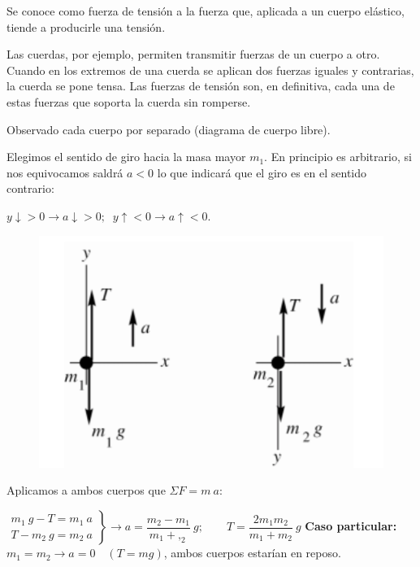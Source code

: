 \vspace{6mm} %
\small{\textsf{Se conoce como fuerza de tensión a la fuerza que, aplicada a un cuerpo elástico, tiende a producirle una tensión.}}

\small{\textsf{Las cuerdas, por ejemplo, permiten transmitir fuerzas de un cuerpo a otro. Cuando en los extremos de una cuerda se aplican dos fuerzas iguales y contrarias, la cuerda se pone tensa. Las fuerzas de tensión son, en definitiva, cada una de estas fuerzas que soporta la cuerda sin romperse}}\normalsize{.}

\begin{multicols}{2}
Observado cada cuerpo por separado (diagrama de cuerpo libre).

Elegimos el sentido de giro hacia la masa mayor $m_1$. En principio es arbitrario, si nos equivocamos saldrá $a<0$ lo que indicará que el giro es en el sentido contrario:

\noindent \small{$y \downarrow >0 \to a \downarrow > 0;\; \; y \uparrow < 0 \to a \uparrow < 0$}\normalsize{.}
\begin{figure}[H]
	\centering
	\includegraphics[width=.4\textwidth]{imagenes/imagenes03/T03IM34.png}
	\end{figure}
\end{multicols}


Aplicamos a ambos cuerpos que $\Sigma F=m \ a$:

$\left.
\begin{matrix} 
 m_1 \ g -T =m_1 \ a \\ T - m_2 \ g =m_2 \ a	
\end{matrix}
\right\} \displaystyle \to a=\dfrac{m_2 - m_1}{m_1+,_2} \ g;  \qquad T=\dfrac {2m_1m_2}{m_1+m_2}\ g $
 \textbf{Caso particular:} $m_1=m_2 \to a=0 \quad (T=mg)$, ambos cuerpos estarían en reposo.



